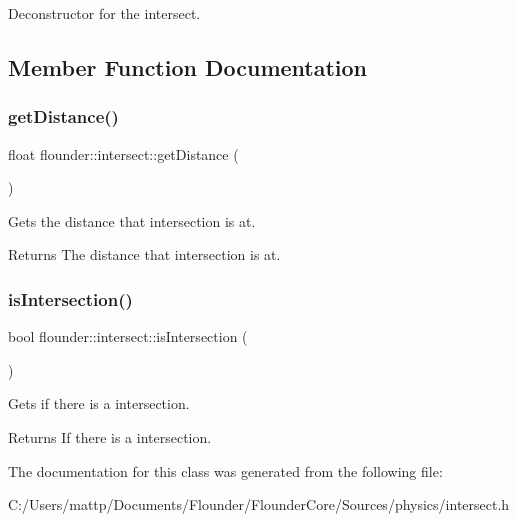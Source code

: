 Deconstructor for the intersect. 



\subsection{Member Function Documentation}
\mbox{\label{classflounder_1_1intersect_ab3f00d53d2614603bda044a43b27d679}} 
\subsubsection{\texorpdfstring{get\+Distance()}{getDistance()}}
{\footnotesize\ttfamily float flounder\+::intersect\+::get\+Distance (\begin{DoxyParamCaption}{ }\end{DoxyParamCaption})\hspace{0.3cm}{\ttfamily [inline]}}



Gets the distance that intersection is at. 

\begin{DoxyReturn}{Returns}
The distance that intersection is at. 
\end{DoxyReturn}
\mbox{\label{classflounder_1_1intersect_a680386b9684782d4b115ca380068ff3e}} 
\subsubsection{\texorpdfstring{is\+Intersection()}{isIntersection()}}
{\footnotesize\ttfamily bool flounder\+::intersect\+::is\+Intersection (\begin{DoxyParamCaption}{ }\end{DoxyParamCaption})\hspace{0.3cm}{\ttfamily [inline]}}



Gets if there is a intersection. 

\begin{DoxyReturn}{Returns}
If there is a intersection. 
\end{DoxyReturn}


The documentation for this class was generated from the following file\+:\begin{DoxyCompactItemize}
\item 
C\+:/\+Users/mattp/\+Documents/\+Flounder/\+Flounder\+Core/\+Sources/physics/intersect.\+h\end{DoxyCompactItemize}
